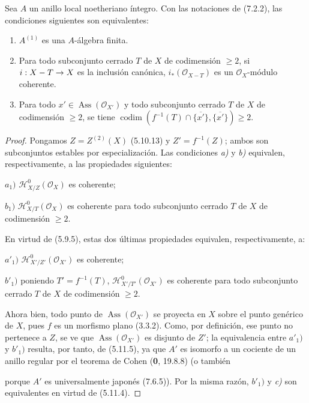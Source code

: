 \begin{proposition}[7.2.3]
\label{IV.2.s7.2.3-fr}
Sea $A$ un anillo local noetheriano íntegro. Con las notaciones de
\textup{(7.2.2)}, las condiciones siguientes son equivalentes:
\begin{enumerate}
\item[\textup{a)}] $A^{(1)}$ es una $A$-álgebra finita.
\item[\textup{b)}] Para todo subconjunto cerrado $T$ de $X$ de codimensión
$\geqslant2$, si $i:X- T\to X$ es la inclusión canónica,
$i_*(\mathscr O_{X-T})$ es un $\mathscr O_X$-módulo coherente.
\item[\textup{c)}] Para todo $x'\in\operatorname{Ass}(\mathscr O_{X'})$ y todo
subconjunto cerrado $T$ de $X$ de codimensión $\geqslant2$, se tiene
$\operatorname{codim}(f^{-1}(T)\cap\overline{\{x'\}},
\overline{\{x'\}})\geqslant2$.
\end{enumerate}
\end{proposition}

\begin{proof}
Pongamos $Z=Z^{(2)}(X)$ (5.10.13) y $Z'=f^{-1}(Z)$; ambos son
subconjuntos estables por especialización. Las condiciones \emph{a)} y \emph{b)}
equivalen, respectivamente, a las propiedades siguientes:

$a_1)$ $\mathscr H^0_{X/Z}(\mathscr O_X)$ es coherente;

$b_1)$ $\mathscr H^0_{X/T}(\mathscr O_X)$ es coherente para todo
subconjunto cerrado $T$ de $X$ de codimensión $\geqslant2$.

En virtud de (5.9.5), estas dos últimas propiedades equivalen,
respectivamente, a:

$a'_1)$ $\mathscr H^0_{X'/Z'}(\mathscr O_{X'})$ es coherente;

$b'_1)$ poniendo $T'=f^{-1}(T)$,
$\mathscr H^0_{X'/T'}(\mathscr O_{X'})$ es coherente para todo
subconjunto cerrado $T$ de $X$ de codimensión $\geqslant2$.

Ahora bien, todo punto de $\operatorname{Ass}(\mathscr O_{X'})$ se
proyecta en $X$ sobre el punto genérico de $X$, pues $f$ es un
morfismo plano (3.3.2). Como, por definición, ese punto no pertenece
a $Z$, se ve que $\operatorname{Ass}(\mathscr O_{X'})$ es disjunto de
$Z'$; la equivalencia entre $a'_1)$ y $b'_1)$ resulta, por tanto,
de (5.11.5), ya que $A'$ es isomorfo a un cociente de un anillo regular
por el teorema de Cohen (\textbf 0, 19.8.8) (o también


porque $A'$ es universalmente japonés (7.6.5)). Por la misma razón,
$b'_1)$ y \emph{c)} son equivalentes en virtud de (5.11.4).
\end{proof}
